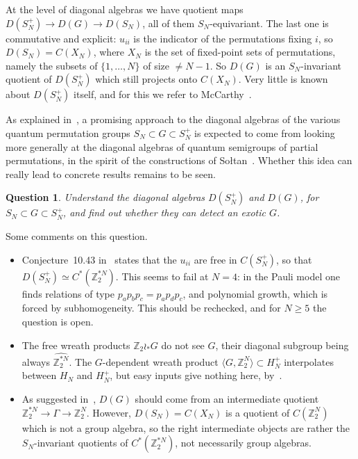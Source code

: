 \documentclass[11pt]{amsart}
\newtheorem{question}[theorem]{Question}
\theoremstyle{definition}
\theoremstyle{remark}
\theoremstyle{plain}
\numberwithin{equation}{section}
\numberwithin{table}{section}
\newcommand{\Z}{\mathbb Z}
\begin{document}
At the level of diagonal algebras we have quotient maps $D(S_N^+)\to D(G)\to D(S_N)$, all of them $S_N$-equivariant. The last one is commutative and explicit: $u_{ii}$ is the indicator of the permutations fixing $i$, so $D(S_N)=C(X_N)$, where $X_N$ is the set of fixed-point sets of permutations, namely the subsets of $\{1,\dots,N\}$ of size $\ne N-1$. So $D(G)$ is an $S_N$-invariant quotient of $D(S_N^+)$ which still projects onto $C(X_N)$. Very little is known about $D(S_N^+)$ itself, and for this we refer to McCarthy~\cite{mc0,mc1,mc2}.

As explained in~\cite[Chapter~8]{bqp}, a promising approach to the diagonal algebras of the various quantum permutation groups $S_N\subset G\subset S_N^+$ is expected to come from looking more generally at the diagonal algebras of quantum semigroups of partial permutations, in the spirit of the constructions of So{\l}tan~\cite{so}. Whether this idea can really lead to concrete results remains to be seen.

\begin{question}\label{qu:diagonal}
Understand the diagonal algebras $D(S_N^+)$ and $D(G)$, for $S_N\subset G\subset S_N^+$, and find out whether they can detect an exotic $G$.
\end{question}

Some comments on this question.
\begin{itemize}
\item Conjecture~10.43 in~\cite{bqp} states that the $u_{ii}$ are free in $C(S_N^+)$, so that $D(S_N^+)\simeq C^*(\Z_2^{*N})$. This seems to fail at $N=4$: in the Pauli model one finds relations of type $p_ap_bp_c=p_ap_dp_c$, and polynomial growth, which is forced by subhomogeneity. This should be rechecked, and for $N\ge5$ the question is open.
\item The free wreath products $\Z_2\wr_*G$ do not see $G$, their diagonal subgroup being always $\widehat{\Z_2^{*N}}$. The $G$-dependent wreath product $\langle G,\Z_2^N\rangle\subset H_N^+$ interpolates between $H_N$ and $H_N^+$, but easy inputs give nothing here, by~\cite{bcs}.
\item As suggested in~\cite{bqp}, $D(G)$ should come from an intermediate quotient $\Z_2^{*N}\to\Gamma\to\Z_2^N$. However, $D(S_N)=C(X_N)$ is a quotient of $C(\Z_2^N)$ which is not a group algebra, so the right intermediate objects are rather the $S_N$-invariant quotients of $C^*(\Z_2^{*N})$, not necessarily group algebras.
\end{itemize}
\end{document}
